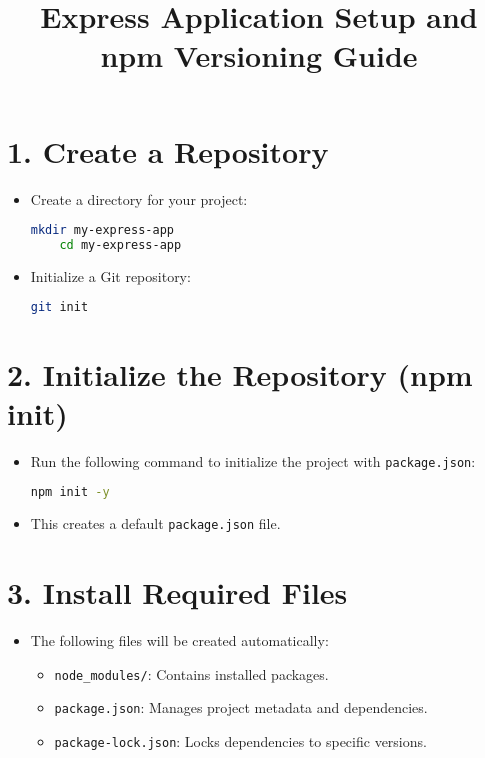 \documentclass[a4paper,12pt]{article}
\title{Express Application Setup and npm Versioning Guide}
\author{}
\date{}
\begin{document}
\maketitle

\section*{1. Create a Repository}
\begin{itemize}
    \item Create a directory for your project:
    \begin{lstlisting}[language=bash]
    mkdir my-express-app
    cd my-express-app
    \end{lstlisting}
    \item Initialize a Git repository:
    \begin{lstlisting}[language=bash]
    git init
    \end{lstlisting}
\end{itemize}

\section*{2. Initialize the Repository (npm init)}
\begin{itemize}
    \item Run the following command to initialize the project with \texttt{package.json}:
    \begin{lstlisting}[language=bash]
    npm init -y
    \end{lstlisting}
    \item This creates a default \texttt{package.json} file.
\end{itemize}

\section*{3. Install Required Files}
\begin{itemize}
    \item The following files will be created automatically:
    \begin{itemize}
        \item \texttt{node\_modules/}: Contains installed packages.
        \item \texttt{package.json}: Manages project metadata and dependencies.
        \item \texttt{package-lock.json}: Locks dependencies to specific versions.
    \end{itemize}
\end{itemize}
\end{document}
